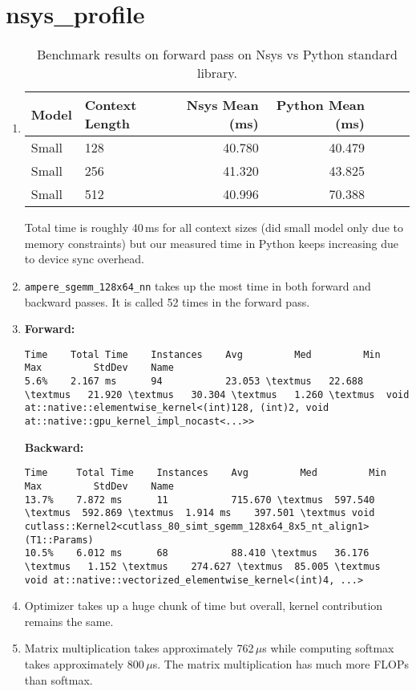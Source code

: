 \documentclass{article}
\begin{document}
\newpage
\section{nsys\_profile}

\begin{enumerate}
\item
\begin{table}[h!]
\centering
\caption{Benchmark results on forward pass on Nsys vs Python standard library.}
\label{tab:benchmark}
\begin{tabular}{llrrrrr}
\toprule
Model & Context Length & Nsys Mean (ms) & Python Mean (ms) \\
\midrule
Small  & 128 & 40.780  & 40.479 \\
Small  & 256 & 41.320  & 43.825 \\
Small  & 512 & 40.996  & 70.388 \\
\bottomrule
\end{tabular}
\end{table}

Total time is roughly 40\,ms for all context sizes (did small model only due to memory constraints) but our measured time in Python keeps increasing due to device sync overhead.

\item
\texttt{ampere\_sgemm\_128x64\_nn} takes up the most time in both forward and backward passes. It is called 52 times in the forward pass.

\item
\textbf{Forward:}
\begin{lstlisting}
Time    Total Time    Instances    Avg         Med         Min         Max         StdDev    Name
5.6%    2.167 ms      94           23.053 \textmus   22.688 \textmus   21.920 \textmus   30.304 \textmus   1.260 \textmus  void at::native::elementwise_kernel<(int)128, (int)2, void at::native::gpu_kernel_impl_nocast<...>>
\end{lstlisting}

\noindent\textbf{Backward:}
\begin{lstlisting}
Time     Total Time    Instances    Avg         Med         Min         Max         StdDev    Name
13.7%    7.872 ms      11           715.670 \textmus  597.540 \textmus  592.869 \textmus  1.914 ms    397.501 \textmus void cutlass::Kernel2<cutlass_80_simt_sgemm_128x64_8x5_nt_align1>(T1::Params)
10.5%    6.012 ms      68           88.410 \textmus   36.176 \textmus   1.152 \textmus    274.627 \textmus  85.005 \textmus  void at::native::vectorized_elementwise_kernel<(int)4, ...>
\end{lstlisting}

\item
Optimizer takes up a huge chunk of time but overall, kernel contribution remains the same.

\item
Matrix multiplication takes approximately 762\,$\mu$s while computing softmax takes approximately 800\,$\mu$s. The matrix multiplication has much more FLOPs than softmax.
\end{enumerate}
\end{document}
